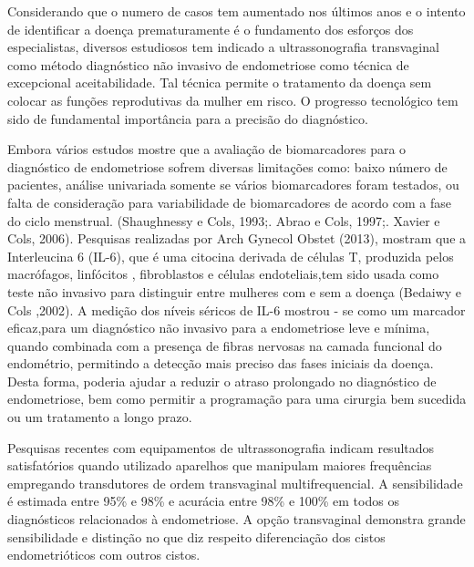 \documentclass[12pt]{article} %
\begin{document}
Considerando que o numero de casos tem aumentado nos últimos anos e o intento de
identificar a doença prematuramente é o fundamento dos esforços dos especialistas, diversos estudiosos tem indicado a ultrassonografia transvaginal como método diagnóstico não invasivo de endometriose como técnica de excepcional aceitabilidade.  Tal técnica permite o tratamento da doença sem colocar as funções reprodutivas da mulher em risco. O progresso tecnológico tem sido de fundamental importância para a precisão do diagnóstico.

Embora vários estudos mostre que a avaliação de biomarcadores para o diagnóstico de endometriose sofrem diversas limitações como: baixo número de pacientes, análise univariada somente se vários biomarcadores foram testados, ou falta de consideração para variabilidade de biomarcadores de acordo com a fase do ciclo menstrual. (Shaughnessy e Cols, 1993;. Abrao e Cols, 1997;. Xavier e Cols, 2006).
Pesquisas realizadas por Arch Gynecol Obstet (2013), mostram que a Interleucina 6 (IL-6), que é uma citocina derivada de células T, produzida pelos macrófagos, linfócitos , fibroblastos e células endoteliais,tem sido usada como teste não invasivo para distinguir entre mulheres com e sem a doença (Bedaiwy e Cols ,2002). A medição dos níveis séricos de
IL-6 mostrou - se como um marcador eficaz,para um diagnóstico não invasivo para a endometriose leve e mínima, quando combinada com a presença de fibras nervosas na camada funcional do endométrio, permitindo a detecção mais preciso das fases iniciais da doença. Desta forma,  poderia ajudar a
reduzir o atraso prolongado no diagnóstico de endometriose,
bem como permitir a programação para uma cirurgia bem sucedida ou um tratamento a longo prazo.


Pesquisas recentes com equipamentos de ultrassonografia indicam resultados satisfatórios quando utilizado aparelhos que manipulam maiores frequências empregando transdutores de ordem transvaginal multifrequencial. A sensibilidade é estimada entre 95\% e 98\% e acurácia entre 98\% e 100\% em todos os diagnósticos relacionados à endometriose. A opção transvaginal demonstra grande sensibilidade e distinção no que diz respeito diferenciação dos cistos endometrióticos com outros cistos.
\end{document}
